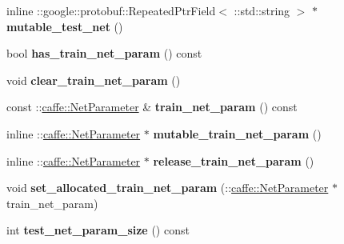 \begin{DoxyCompactItemize}
\mbox{\label{classcaffe_1_1_solver_parameter_a2c2accb804b4fb5dfab3981f2318b3c2}} 
inline \+::google\+::protobuf\+::\+Repeated\+Ptr\+Field$<$ \+::std\+::string $>$ $\ast$ {\bfseries mutable\+\_\+test\+\_\+net} ()
\item 
\mbox{\label{classcaffe_1_1_solver_parameter_aa324451e3753df304e4265c2bc2e7bf9}} 
bool {\bfseries has\+\_\+train\+\_\+net\+\_\+param} () const
\item 
\mbox{\label{classcaffe_1_1_solver_parameter_a95a45bbc191886034efdf83141dfcb36}} 
void {\bfseries clear\+\_\+train\+\_\+net\+\_\+param} ()
\item 
\mbox{\label{classcaffe_1_1_solver_parameter_ae23a8dd0af2319d1bcce21e83be1434c}} 
const \+::\mbox{\hyperlink{classcaffe_1_1_net_parameter}{caffe\+::\+Net\+Parameter}} \& {\bfseries train\+\_\+net\+\_\+param} () const
\item 
\mbox{\label{classcaffe_1_1_solver_parameter_a193545d6b2390c899df732665c4dbc78}} 
inline \+::\mbox{\hyperlink{classcaffe_1_1_net_parameter}{caffe\+::\+Net\+Parameter}} $\ast$ {\bfseries mutable\+\_\+train\+\_\+net\+\_\+param} ()
\item 
\mbox{\label{classcaffe_1_1_solver_parameter_a5959c65fd11fe7d88487206a8d7cec46}} 
inline \+::\mbox{\hyperlink{classcaffe_1_1_net_parameter}{caffe\+::\+Net\+Parameter}} $\ast$ {\bfseries release\+\_\+train\+\_\+net\+\_\+param} ()
\item 
\mbox{\label{classcaffe_1_1_solver_parameter_add4025bbe077733b4050fa6b0f3e08f8}} 
void {\bfseries set\+\_\+allocated\+\_\+train\+\_\+net\+\_\+param} (\+::\mbox{\hyperlink{classcaffe_1_1_net_parameter}{caffe\+::\+Net\+Parameter}} $\ast$train\+\_\+net\+\_\+param)
\item 
\mbox{\label{classcaffe_1_1_solver_parameter_a99f6ba944ba55d2052aac6ee2d041155}} 
int {\bfseries test\+\_\+net\+\_\+param\+\_\+size} () const
\item 
\mbox{\label{classcaffe_1_1_solver_parameter_aed6cb6dc198fe8c38447444989102517}} 

\end{DoxyCompactItemize}
